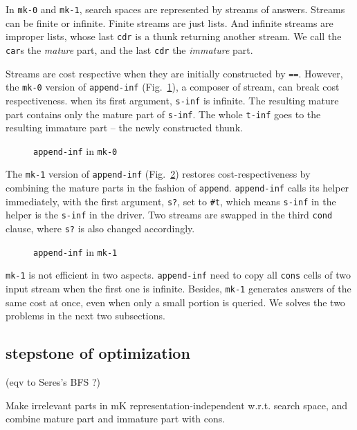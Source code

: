 \documentclass[format=acmlarge, review=true, authordraft=true]{acmart}
\begin{document}
In \texttt{mk-0} and \texttt{mk-1}, search spaces are represented by streams of answers. Streams can be finite or infinite. Finite streams are just lists. And infinite streams are improper lists, whose last \texttt{cdr} is a thunk returning another stream. We call the \texttt{car}s the \emph{mature} part, and the last \texttt{cdr} the \emph{immature} part. 

Streams are cost respective when they are initially constructed by \texttt{==}. However, the \texttt{mk-0} version of \texttt{append-inf} (Fig.~\ref{append-inf-0}), a composer of stream, can break cost respectiveness. when its first argument, \texttt{s-inf} is infinite. The resulting mature part contains only the mature part of \texttt{s-inf}. The whole \texttt{t-inf} goes to the resulting immature part -- the newly constructed thunk.

\begin{figure}
	 	
	 \caption{\texttt{append-inf} in \texttt{mk-0}}
	 \label{append-inf-0}
\end{figure}


The \texttt{mk-1} version of \texttt{append-inf} (Fig.~\ref{append-inf-1}) restores cost-respectiveness by combining the mature parts in the fashion of \texttt{append}. \texttt{append-inf} calls its helper immediately, with the first argument, \texttt{s?}, set to \texttt{\#{}t}, which means \texttt{s-inf} in the helper is the \texttt{s-inf} in the driver. Two streams are swapped in the third \texttt{cond} clause, where \texttt{s?} is also changed accordingly.

\begin{figure}
	 	
	 \caption{\texttt{append-inf} in \texttt{mk-1}}
	 \label{append-inf-1}
\end{figure}

\texttt{mk-1} is not efficient in two aspects. \texttt{append-inf} need to copy all \texttt{cons} cells of two input stream when the first one is infinite. Besides, \texttt{mk-1} generates answers of the same cost at once, even when only a small portion is queried. We solves the two problems in the next two subsections.

\subsection{stepstone of optimization}

(eqv to Seres's BFS ?)

Make irrelevant parts in mK representation-independent w.r.t. search space, and combine mature part and immature part with cons.
\end{document}
